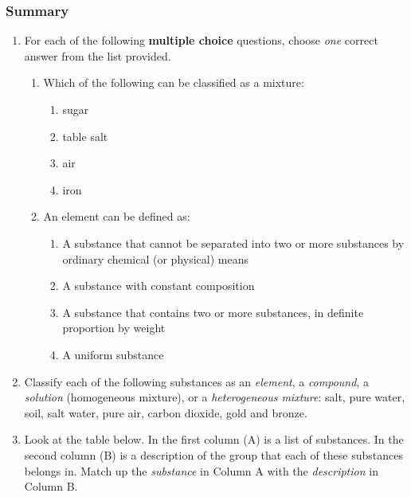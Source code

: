             \subsubsection{  Summary
      }
            \nopagebreak
      \label{m38706*id67920}\begin{enumerate}[noitemsep, label=\textbf{\arabic*}. ] 
            \label{m38706*uid133}\item For each of the following \textbf{multiple choice} questions, choose \textsl{one} correct answer from the list provided.
\label{m38706*id67947}\begin{enumerate}[noitemsep, label=\textbf{\alph*}. ] 
            \label{m38706*uid134}\item Which of the following can be classified as a mixture:
\label{m38706*id67963}\begin{enumerate}[noitemsep, label=\textbf{\alph*}. ] 
            \label{m38706*uid135}\item sugar
\label{m38706*uid136}\item table salt
\label{m38706*uid137}\item air
\label{m38706*uid138}\item iron
\end{enumerate}
                \label{m38706*uid139}\item An element can be defined as:
\label{m38706*id68029}\begin{enumerate}[noitemsep, label=\textbf{\alph*}. ] 
            \label{m38706*uid140}\item A substance that cannot be separated into two or more substances by ordinary chemical (or physical) means
\label{m38706*uid141}\item A substance with constant composition
\label{m38706*uid142}\item A substance that contains two or more substances, in definite proportion by weight
\label{m38706*uid143}\item A uniform substance
\end{enumerate}
                \end{enumerate}
\label{m38706*uid144}\item Classify each of the following substances as an \textsl{element}, a \textsl{compound}, a \textsl{solution} (homogeneous mixture), or a \textsl{heterogeneous mixture}: salt, pure water, soil, salt water, pure air, carbon dioxide, gold and bronze.\newline
\label{m38706*uid145}\item Look at the table below. In the first column (A) is a list of substances. In the second column (B) is a description of the group that each of these substances belongs in. Match up the \textsl{substance} in Column A with the \textsl{description} in Column B.

\end{enumerate}
